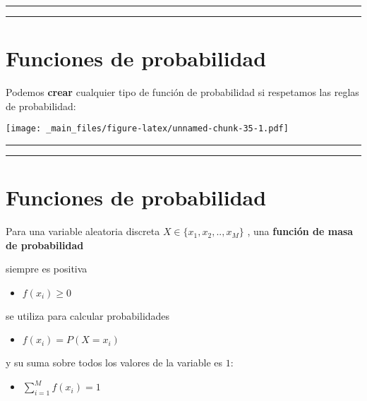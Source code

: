 \documentclass[
]{book}
\providecommand{\tightlist}{%
  \setlength{\itemsep}{0pt}\setlength{\parskip}{0pt}}
\begin{document}
\begin{center}\rule{0.5\linewidth}{0.5pt}\end{center}

\begin{center}\rule{0.5\linewidth}{0.5pt}\end{center}

\hypertarget{funciones-de-probabilidad-1}{%
\section{Funciones de probabilidad}\label{funciones-de-probabilidad-1}}

Podemos \textbf{crear} cualquier tipo de función de probabilidad si respetamos las reglas de probabilidad:

\texttt{[image: \_main\_files/figure-latex/unnamed-chunk-35-1.pdf]}

\begin{center}\rule{0.5\linewidth}{0.5pt}\end{center}

\begin{center}\rule{0.5\linewidth}{0.5pt}\end{center}

\hypertarget{funciones-de-probabilidad-2}{%
\section{Funciones de probabilidad}\label{funciones-de-probabilidad-2}}

Para una variable aleatoria discreta \(X \in \{x_1 , x_2 , .. , x_M\}\) , una \textbf{función de masa de probabilidad}

siempre es positiva

\begin{itemize}
\tightlist
\item
  \(f(x_i)\geq 0\)
\end{itemize}

se utiliza para calcular probabilidades

\begin{itemize}
\tightlist
\item
  \(f(x_i)=P(X=x_i)\)
\end{itemize}

y su suma sobre todos los valores de la variable es \(1\):

\begin{itemize}
\tightlist
\item
  \(\sum_{i=1}^M f(x_i)=1\)
\end{itemize}
\end{document}
